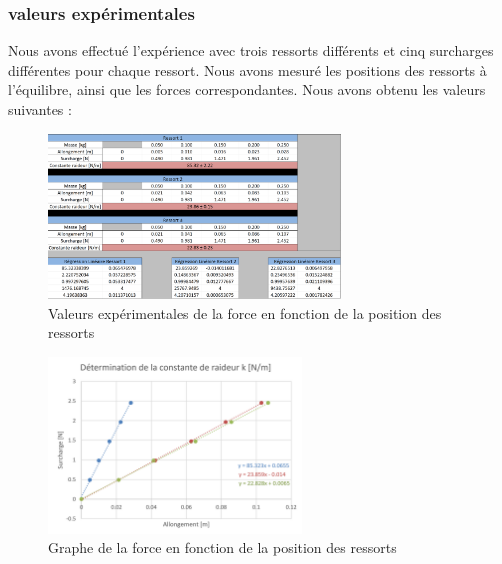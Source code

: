             \newpage

        \subsubsection{valeurs expérimentales}
            Nous avons effectué l'expérience avec trois ressorts différents et cinq surcharges
            différentes pour chaque ressort. Nous avons mesuré les positions des ressorts à l'équilibre, ainsi que
            les forces correspondantes. Nous avons obtenu les valeurs suivantes :
            \begin{figure}[h]
                \centering
                \includegraphics[width=0.69\textwidth]{images/Capture.PNG}
                \caption{Valeurs expérimentales de la force en fonction de la position des ressorts}
            \end{figure}
            \hspace{1cm}
            \begin{figure}[h]
                \centering
                \includegraphics[width=0.6\textwidth]{images/graphe_k.PNG}
                \caption{Graphe de la force en fonction de la position des ressorts}
            \end{figure}

            \newpage

